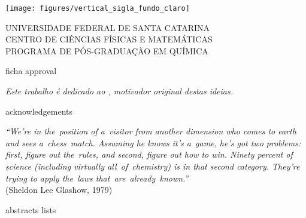 \frenchspacing                %


\renewcommand{\imprimircapa}{%
	\begin{capa}%
		\begin{center}
			\texttt{[image: figures/vertical\_sigla\_fundo\_claro]}
		\end{center}

		\center
		\ABNTEXchapterfont\large
		UNIVERSIDADE FEDERAL DE SANTA CATARINA \\
		CENTRO DE CIÊNCIAS FÍSICAS E MATEMÁTICAS \\
		PROGRAMA DE PÓS-GRADUAÇÃO EM QUÍMICA

		\vfill

		{\ABNTEXchapterfont\large\imprimirautor}

		\vfill
		\begin{center}
			\ABNTEXchapterfont\bfseries\Large\imprimirtitulo
		\end{center}
		\vfill

		\large\imprimirlocal

		\large\imprimirdata

		\vspace*{1cm}
	\end{capa}
}

\imprimircapa{}
\imprimirfolhaderosto*    %

{ficha}
{approval}

\begin{dedicatoria}
	\vspace*{\fill}
	\centering
	\noindent
	\emph{
		Este trabalho é dedicado ao \imprimircoorientador,
		motivador original destas ideias.} \vspace*{\fill}
\end{dedicatoria}

{acknowledgements}

\begin{epigrafe}
	\vspace*{\fill}
	\begin{flushright}
		\textit{
			``We're in the~position of a~visitor from another dimension who comes to
			earth and sees a~chess~match.
			Assuming he knows it's a~game, he's got two problems:
			first, figure out
			the~rules, and second, figure out how to win.
			Ninety percent of science (including virtually all~of~chemistry) is in
			that second category.
			They're trying to apply the~laws that~are~already~known.''} \\
		(Sheldon Lee Glashow, 1979)
	\end{flushright}
\end{epigrafe}

{abstracts}
{lists}

\cleardoublepage{}
